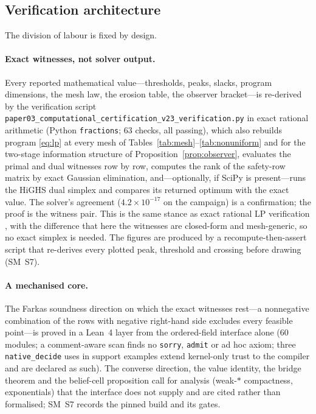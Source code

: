 \subsection{Verification architecture}\label{sec:verification}

The division of labour is fixed by design.

\paragraph{Exact witnesses, not solver output.}
Every reported mathematical value---thresholds, peaks, slacks, program dimensions, the mesh law, the erosion table, the observer bracket---is re-derived by the verification script \texttt{paper03\_computational\_certification\_v23\_verification.py} in exact rational arithmetic (Python \texttt{fractions}; 63 checks, all passing), which also rebuilds program \eqref{eq:lp} at every mesh of Tables~\ref{tab:mesh}--\ref{tab:nonuniform} and for the two-stage information structure of Proposition~\ref{prop:observer}, evaluates the primal and dual witnesses row by row, computes the rank of the safety-row matrix by exact Gaussian elimination, and---optionally, if SciPy is present---runs the HiGHS dual simplex \cite{HuangfuHall2018} and compares its returned optimum with the exact value. The solver's agreement ($4.2\times10^{-17}$ on the campaign) is a confirmation; the proof is the witness pair. This is the same stance as exact rational LP verification \cite{Applegate2007}, with the difference that here the witnesses are closed-form and mesh-generic, so no exact simplex is needed. The figures are produced by a recompute-then-assert script that re-derives every plotted peak, threshold and crossing before drawing (SM~S7).

\paragraph{A mechanised core.}
The Farkas soundness direction on which the exact witnesses rest---a nonnegative combination of the rows with negative right-hand side excludes every feasible point---is proved in a Lean~4 \cite{deMouraUllrich2021} layer from the ordered-field interface alone (60 modules; a comment-aware scan finds no \texttt{sorry}, \texttt{admit} or ad hoc axiom; three \texttt{native\_decide} uses in support examples extend kernel-only trust to the compiler and are declared as such). The converse direction, the value identity, the bridge theorem and the belief-cell proposition call for analysis (weak-$\ast$ compactness, exponentials) that the interface does not supply and are cited rather than formalised; SM~S7 records the pinned build and its gates.

